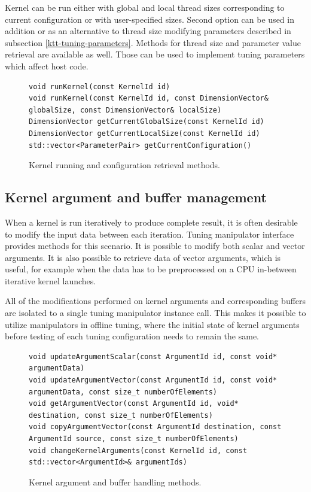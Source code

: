 \documentclass
[
    digital, %
    oneside, %
    table, %
    nolof, %
    nolot, %
    nocover %
]{fithesis3}
\begin{document}
Kernel can be run either with global and local thread sizes corresponding to current configuration or with user-specified sizes. Second option can be
used in addition or as an alternative to thread size modifying parameters described in subsection \ref{ktt-tuning-parameters}. Methods for thread size
and parameter value retrieval are available as well. Those can be used to implement tuning parameters which affect host code.

\begin{figure}
\begin{adjustwidth}{-1cm}{-1cm}
\begin{lstlisting}
void runKernel(const KernelId id)
void runKernel(const KernelId id, const DimensionVector& globalSize, const DimensionVector& localSize)
DimensionVector getCurrentGlobalSize(const KernelId id)
DimensionVector getCurrentLocalSize(const KernelId id)
std::vector<ParameterPair> getCurrentConfiguration()
\end{lstlisting}
\caption{Kernel running and configuration retrieval methods.}
\label{ktt-manipulator-kernel-methods}
\end{adjustwidth}
\end{figure}

\subsection{Kernel argument and buffer management}
When a kernel is run iteratively to produce complete result, it is often desirable to modify the input data between each iteration. Tuning manipulator
interface provides methods for this scenario. It is possible to modify both scalar and vector arguments. It is also possible to retrieve data of
vector arguments, which is useful, for example when the data has to be preprocessed on a CPU in-between iterative kernel launches.

All of the modifications performed on kernel arguments and corresponding buffers are isolated to a single tuning manipulator instance call. This makes
it possible to utilize manipulators in offline tuning, where the initial state of kernel arguments before testing of each tuning configuration needs to
remain the same.

\begin{figure}
\begin{adjustwidth}{-1cm}{-1cm}
\begin{lstlisting}
void updateArgumentScalar(const ArgumentId id, const void* argumentData)
void updateArgumentVector(const ArgumentId id, const void* argumentData, const size_t numberOfElements)
void getArgumentVector(const ArgumentId id, void* destination, const size_t numberOfElements)
void copyArgumentVector(const ArgumentId destination, const ArgumentId source, const size_t numberOfElements)
void changeKernelArguments(const KernelId id, const std::vector<ArgumentId>& argumentIds)
\end{lstlisting}
\caption{Kernel argument and buffer handling methods.}
\label{ktt-manipulator-buffer-methods}
\end{adjustwidth}
\end{figure}
\end{document}
